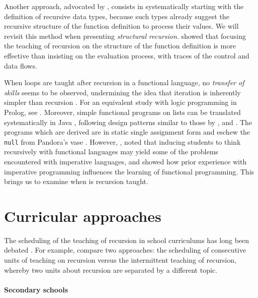 \documentclass[11pt,a4paper]{article}
\newcommand\plang[1]{\textsf{#1}\xspace}
\newcommand\exc[1]{\texttt{\small #1}}
\begin{document}
Another approach, advocated by
\textcite{FelleisenFindlerFlattKrishnamurthi:2001}, consists in
systematically starting with the definition of recursive data types,
because such types already suggest the recursive structure of the
function definition to process their values. We will revisit this
method when presenting \emph{structural
  recursion}. \textcite{Pirolli:1986} showed that focusing the
teaching of recursion on the structure of the function definition is
more effective than insisting on the evaluation process, with traces
of the control and data flows.

When loops are taught after recursion in a functional language, no
\emph{transfer of skills} seems to be observed, undermining the idea
that iteration is inherently simpler than recursion
\citep{Mirolo:2011}. For an equivalent study with logic programming in
\plang{Prolog}, see \textcite{Haberman:2004}. Moreover, simple
functional programs on lists can be translated systematically in
\plang{Java} \citep{Rinderknecht:2012}, following design patterns
similar to those by \textcite{FelleisenFriedman:1997},
\textcite{Bloch:2003} and \textcite{Sher:2004}. The programs which are
derived are in static single assignment form and eschew the \exc{null}
from Pandora's vase \citep{Cobbe:2008,Hoare:2009}. However,
\textcite{Segal:1994}, \textcite{ClackMyers:1995} noted that inducing
students to think recursively with functional languages may yield some
of the problems encountered with imperative languages, and
\textcite{PazLapidot:2004} showed how prior experience with imperative
programming influences the learning of functional programming. This
brings us to examine when is recursion taught.


\section{Curricular approaches}

The scheduling of the teaching of recursion in school curriculums has
long been debated
\citep{Olson:1987,BarfurthRetschitzki:1987,Greer:1989}. For example,
\textcite{ZmudaHatch:2007} compare two approaches: the scheduling of
consecutive units of teaching on recursion versus the intermittent
teaching of recursion, whereby two units about recursion are separated
by a different topic.

\paragraph{Secondary schools}
\label{secondary_to_college}
\end{document}
